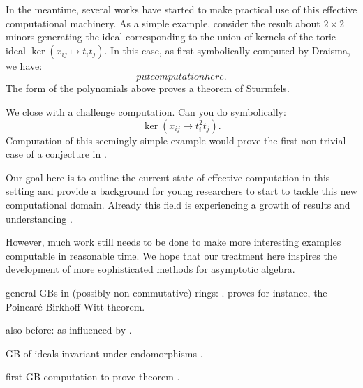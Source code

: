 In the meantime, several works have started to make practical use of this effective computational machinery.  As a simple example, consider the result about $2 \times 2$ minors generating the ideal corresponding to the union of kernels of the toric ideal $\ker{(x_{ij} \mapsto t_i t_j)}$.  In this case, as first symbolically computed by Draisma, we have:
\[ put computation here.\]
The form of the polynomials above proves a theorem of Sturmfels.

We close with a challenge computation.  Can you do symbolically:
\[ \ker{(x_{ij} \mapsto t_i^2 t_j)}.\]
Computation of this seemingly simple example would prove the first non-trivial case of a conjecture in \cite{aschenbrenner2007finite}.

Our goal here is to outline the current state of effective computation in this setting and provide a background for young researchers to start to tackle this new computational domain.  Already this field is experiencing a growth of results and understanding \cite{Nagel, krone2016hilbert}.

However, much work still needs to be done to make more interesting examples computable in reasonable time.  We hope that our treatment here inspires the development of more sophisticated methods for asymptotic algebra.


\cite{kemer2008analog}


general GBs in (possibly non-commutative) rings:  \cite{bergman1978diamond}.  proves for instance, the Poincar\'e-Birkhoff-Witt theorem.

also before: \cite{bokut1976embeddings} as influenced by \cite{shirshov1962some}.

GB of ideals invariant under endomorphisms \cite{drensky2006grobner, la2009letterplace}.

first GB computation to prove theorem \cite{Brouwer09e}.













